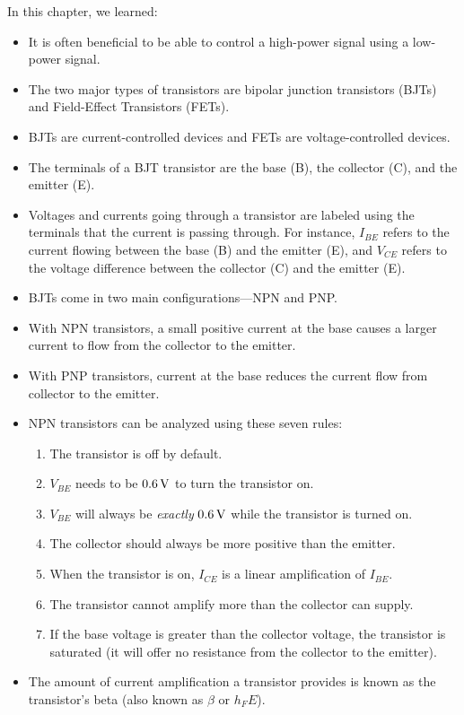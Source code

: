In this chapter, we learned:
\begin{itemize}
\item It is often beneficial to be able to control a high-power signal using a low-power signal.
\item The two major types of transistors are bipolar junction transistors (BJTs) and Field-Effect Transistors (FETs).
\item BJTs are current-controlled devices and FETs are voltage-controlled devices.
\item The terminals of a BJT transistor are the base (B), the collector (C), and the emitter (E).
\item Voltages and currents going through a transistor are labeled using the terminals that the current is passing through.  For instance, $I_{BE}$ refers to the current flowing between the base (B) and the emitter (E), and $V_{CE}$ refers to the voltage difference between the collector (C) and the emitter (E).
\item BJTs come in two main configurations---NPN and PNP.
\item With NPN transistors, a small positive current at the base causes a larger current to flow from the collector to the emitter.
\item With PNP transistors, current at the base reduces the current flow from collector to the emitter.
\item NPN transistors can be analyzed using these seven rules:
\begin{enumerate}
\item The transistor is off by default.
\item $V_{BE}$ needs to be $0.6\,\si{\volt}$ to turn the transistor on.
\item $V_{BE}$ will always be \emph{exactly} $0.6\,\si{\volt}$ while the transistor is turned on.
\item The collector should always be more positive than the emitter.
\item When the transistor is on, $I_{CE}$ is a linear amplification of $I_{BE}$.
\item The transistor cannot amplify more than the collector can supply.
\item If the base voltage is greater than the collector voltage, the transistor is saturated (it will offer no resistance from the collector to the emitter).
\end{enumerate}
\item The amount of current amplification a transistor provides is known as the transistor's beta (also known as $\beta$ or $h_FE$).

\end{itemize}
